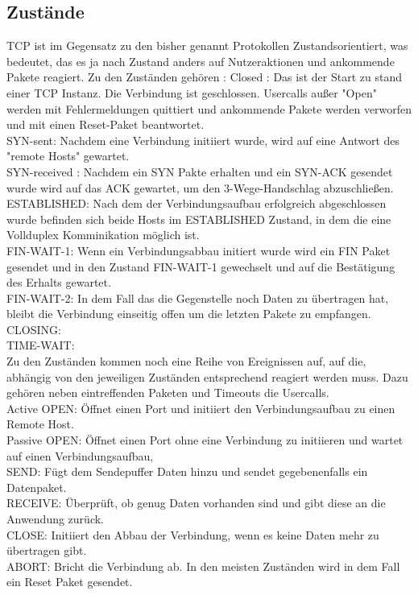 \subsection{Zustände}
TCP ist im Gegensatz zu den bisher genannt Protokollen Zustandsorientiert, was bedeutet, das es ja nach Zustand anders auf Nutzeraktionen und ankommende Pakete reagiert. 
Zu den Zuständen gehören :
Closed : Das ist der Start zu stand einer TCP Instanz. Die Verbindung ist geschlossen. Usercalls außer "Open" werden mit Fehlermeldungen quittiert und ankommende Pakete werden verworfen und mit einen Reset-Paket beantwortet.\\
SYN-sent: Nachdem eine Verbindung initiiert wurde, wird auf eine Antwort des "remote Hosts" gewartet. \\
SYN-received : Nachdem ein SYN Pakte erhalten und ein SYN-ACK gesendet wurde wird auf das ACK gewartet, um den 3-Wege-Handschlag abzuschließen. \\
ESTABLISHED: Nach dem der Verbindungsaufbau erfolgreich abgeschlossen wurde befinden sich beide Hosts im ESTABLISHED Zustand, in dem die eine Vollduplex Komminikation möglich ist. \\
FIN-WAIT-1: Wenn ein Verbindungsabbau initiert wurde wird ein FIN Paket gesendet und in den Zustand FIN-WAIT-1 gewechselt und auf die Bestätigung des Erhalts gewartet. \\
FIN-WAIT-2: In dem Fall das die Gegenstelle noch Daten zu übertragen hat, bleibt die Verbindung einseitig offen um die letzten Pakete zu empfangen. \\
CLOSING:	\\
TIME-WAIT: \\


Zu den Zuständen kommen noch eine Reihe von Ereignissen auf, auf die, abhängig von den jeweiligen Zuständen entsprechend reagiert werden muss. 
Dazu gehören neben eintreffenden Paketen und Timeouts die Usercalls.\\
Active OPEN: Öffnet einen Port und initiiert den Verbindungsaufbau zu einen Remote Host.\\
Passive OPEN: Öffnet einen Port ohne eine Verbindung zu initiieren und wartet auf einen Verbindungsaufbau,\\
SEND: Fügt dem Sendepuffer Daten hinzu und sendet gegebenenfalls ein Datenpaket.\\
RECEIVE: Überprüft, ob genug Daten vorhanden sind und gibt diese an die Anwendung zurück.\\
CLOSE: Initiiert den Abbau der Verbindung, wenn es keine Daten mehr zu  übertragen gibt.\\
ABORT: Bricht die Verbindung ab. In den meisten Zuständen wird in dem Fall ein Reset Paket gesendet. \\

